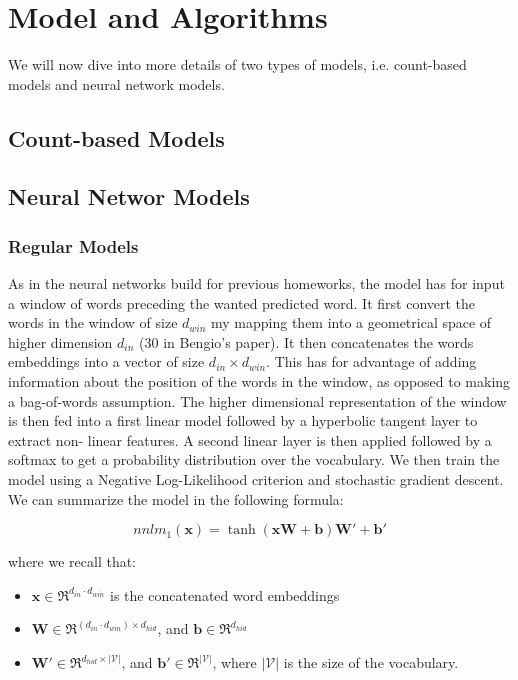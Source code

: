 \documentclass[11pt]{article}
\begin{document}
\section{Model and Algorithms}

We will now dive into more details of two types of models, i.e. count-based models and neural network models.

\subsection{Count-based Models}

\subsection{Neural Networ Models}

\subsubsection{Regular Models}
As in the neural networks build for previous homeworks, the model has for input a window of words preceding the wanted predicted word. It first convert the words in the window of size $d_{win}$ my mapping them into a geometrical space of higher dimension $d_{in}$ (30 in Bengio's paper). It then concatenates the words embeddings into a vector of size $d_{in}\times d_{win}$. This has for advantage of adding information about the position of the words in the window, as opposed to making a bag-of-words assumption. The higher dimensional representation  of the window is then fed into a first linear model followed by a hyperbolic tangent layer to extract  non- linear features. A second linear layer is then applied followed by a softmax to get a probability distribution over the vocabulary. We then train the model using a Negative Log-Likelihood criterion and stochastic gradient descent.\\

\noindent We can summarize the model in the following formula:

$$ nnlm_1(\boldsymbol{x}) = \tanh(\boldsymbol{xW}+\boldsymbol{b})\boldsymbol{W'}+\boldsymbol{b'}$$

where we recall that:
\begin{itemize}
\item $\boldsymbol{x}\in \Re^{d_{in}\cdot d_{win}}$ is the concatenated word embeddings
\item $\boldsymbol{W}\in \Re^{(d_{in}\cdot d_{win})\times d_{hid}}$, and $\boldsymbol{b}\in \Re^{d_{hid}}$
\item $\boldsymbol{W'}\in \Re^{d_{hid}\times |\mathcal{V}|}$, and $\boldsymbol{b'}\in \Re^{|\mathcal{V}|}$, where $|\mathcal{V}|$ is the size of the vocabulary.
\end{itemize}
\end{document}
